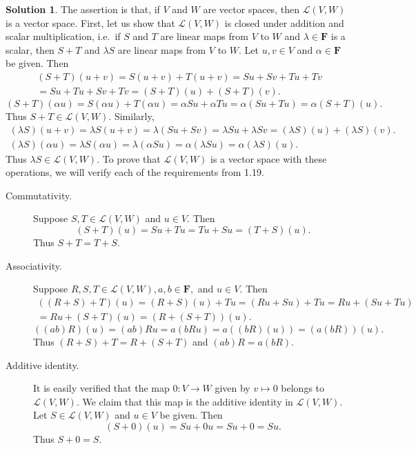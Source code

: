 \documentclass[12pt]{article}
\theoremstyle{definition}
\theoremstyle{exercise}
\theoremstyle{solution}
\newtheorem*{solution}{Solution}
\newcommand{\lmap}{\mathcal{L}}
\newcommand{\F}{\mathbf{F}}
\begin{document}
\begin{solution}
    The assertion is that, if \( V \) and \( W \) are vector spaces, then \( \lmap(V, W) \) is a vector space. First, let us show that \( \lmap(V, W) \) is closed under addition and scalar multiplication, i.e.\ if \( S \) and \( T \) are linear maps from \( V \) to \( W \) and \( \lambda \in \F \) is a scalar, then \( S + T \) and \( \lambda S \) are linear maps from \( V \) to \( W \). Let \( u, v \in V \) and \( \alpha \in \F \) be given. Then
    \begin{multline*}
        (S + T)(u + v) = S(u + v) + T(u + v) = Su + Sv + Tu + Tv \\ = Su + Tu + Sv + Tv = (S + T)(u) + (S + T)(v).
    \end{multline*}
    \[
        (S + T)(\alpha u) = S(\alpha u) + T(\alpha u) = \alpha S u + \alpha T u = \alpha (S u + T u) = \alpha (S + T)(u).
    \]
    Thus \( S + T \in \lmap(V, W) \). Similarly,
    \begin{gather*}
        (\lambda S)(u + v) = \lambda S(u + v) = \lambda (S u + S v) = \lambda S u + \lambda S v = (\lambda S)(u) + (\lambda S)(v). \\[3mm]
        (\lambda S)(\alpha u) = \lambda S(\alpha u) = \lambda (\alpha S u) = \alpha (\lambda S u) = \alpha (\lambda S)(u).
    \end{gather*}
    Thus \( \lambda S \in \lmap(V, W) \). To prove that \( \lmap(V, W) \) is a vector space with these operations, we will verify each of the requirements from 1.19.
    \begin{description}
        \item[Commutativity.] Suppose \( S, T \in \lmap(V, W) \) and \( u \in V \). Then
        \[
            (S + T)(u) = Su + Tu = Tu + Su = (T + S)(u).
        \]
        Thus \( S + T = T + S \).
        
        \item[Associativity.] Suppose \( R, S, T \in \lmap(V, W), a, b \in \F, \) and \( u \in V \). Then
        \begin{multline*}
            ((R + S) + T)(u) = (R + S)(u) + Tu = (Ru + Su) + Tu = Ru + (Su + Tu) \\ = Ru + (S + T)(u) = (R + (S + T))(u).
        \end{multline*}
        \[
            ((ab)R)(u) = (ab) Ru = a (b Ru) = a ((bR)(u)) = (a(bR))(u).
        \]
        Thus \( (R + S) + T = R + (S + T) \) and \( (ab)R = a(bR) \).

        \item[Additive identity.] It is easily verified that the map \( 0 : V \to W \) given by \( v \mapsto 0 \) belongs to \( \lmap(V, W) \). We claim that this map is the additive identity in \( \lmap(V, W) \). Let \( S \in \lmap(V, W) \) and \( u \in V \) be given. Then
        \[
            (S + 0)(u) = Su + 0u = Su + 0 = Su.
        \]
        Thus \( S + 0 = S \).


\end{description}
\end{solution}
\end{document}
